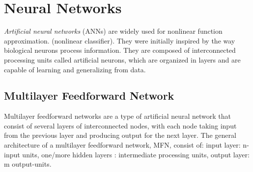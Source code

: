 \documentclass[../main.tex]{subfiles}
\begin{document}
	\chapter{Neural Networks} \label{ch:neural}
	
	
	\noindent \textit{Artificial neural networks} (ANNs) are widely used for nonlinear function approximation. 
	(nonlinear classifier).  They were initially inspired by the way biological neurons process information. 
	They are composed of interconnected processing units called artificial neurons, which are organized in layers and are capable of learning and generalizing from data.	
	
	
	
	\section{Multilayer Feedforward Network}
	\noindent Multilayer feedforward networks are a type of artificial neural network that consist of several layers of interconnected nodes, with each node taking input from the previous layer and producing output for the next layer. The general architecture of a multilayer feedforward network, MFN, consist of: input layer: n-input units,  one/more hidden layers : intermediate processing units, output layer: m output-units. 
	
\end{document}
